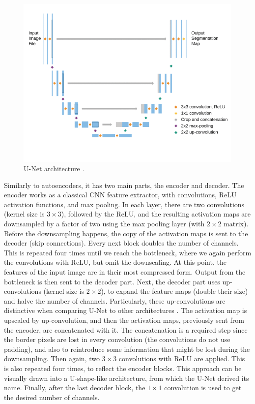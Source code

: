 \begin{figure}[H]
\begin{centering}
\includegraphics[width=12cm]{assets/images/unet.png}
\par\end{centering}
\caption{U-Net architecture \cite{Siddique2021}.}
\label{fig:unet}
\end{figure}

Similarly to autoencoders, it has two main parts, the encoder and decoder. The encoder works as a classical CNN feature extractor, with convolutions, ReLU activation functions, and max pooling. In each layer, there are two convolutions (kernel size is $3\!\times\!3$), followed by the ReLU, and the resulting activation maps are downsampled by a factor of two using the max pooling layer (with $2\!\times\!2$ matrix). Before the downsampling happens, the copy of the activation maps is sent to the decoder (skip connections). Every next block doubles the number of channels. This is repeated four times until we reach the bottleneck, where we again perform the convolutions with ReLU, but omit the downscaling. At this point, the features of the input image are in their most compressed form. Output from the bottleneck is then sent to the decoder part. Next, the decoder part uses up-convolutions (kernel size is $2\!\times\!2$), to expand the feature maps (double their size) and halve the number of channels. Particularly, these up-convolutions are distinctive when comparing U-Net to other architectures \cite{Siddique2021}. The activation map is upscaled by up-convolution, and then the activation maps, previously sent from the encoder, are concatenated with it. The concatenation is a required step since the border pixels are lost in every convolution (the convolutions do not use padding), and also to reintroduce some information that might be lost during the downsampling. Then again, two $3\!\times\!3$ convolutions with ReLU are applied. This is also repeated four times, to reflect the encoder blocks. This approach can be visually drawn into a U-shape-like architecture, from which the U-Net derived its name. Finally, after the last decoder block, the $1\!\times\!1$ convolution is used to get the desired number of channels.

